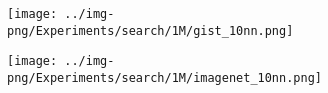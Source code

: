 \begin{figure}[!htb]
\begin{minipage}{\textwidth}
\begin{subfigure}{\soneM\textwidth}
        \end{subfigure}
        \begin{subfigure}{\soneM\textwidth}
            \texttt{[image: ../img-png/Experiments/search/1M/gist\_10nn.png]}
            \caption{} 
            \label{fig:elpis:query:performance:1M:gist:10NN}
        \end{subfigure}
        \begin{subfigure}{\soneM\textwidth}
            \texttt{[image: ../img-png/Experiments/search/1M/imagenet\_10nn.png]}
            \caption{} 
            \label{fig:elpis:query:performance:1M:imagenet:10NN}
        \end{subfigure}
        
        \caption{}
        \label{fig:elpis:query:performance:1M}
    \end{minipage}
\end{figure}


